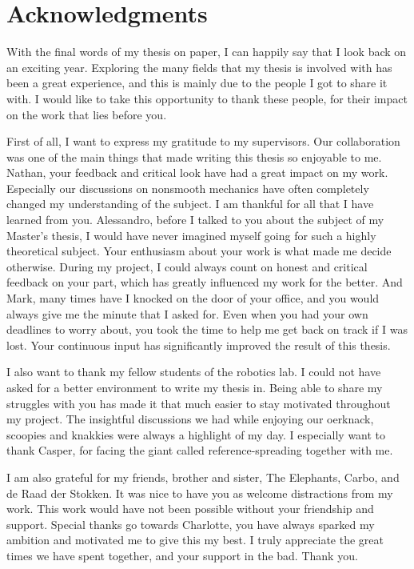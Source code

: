 \documentclass[../DC2019003Bouma.tex]{subfiles}
\begin{document}
\cleartooddpage
\chapter*{Acknowledgments}
With the final words of my thesis on paper, I can happily say that I look back on an exciting year. Exploring the many fields that my thesis is involved with has been a great experience, and this is mainly due to the people I got to share it with. I would like to take this opportunity to thank these people, for their impact on the work that lies before you.

First of all, I want to express my gratitude to my supervisors. Our collaboration was one of the main things that made writing this thesis so enjoyable to me. Nathan, your feedback and critical look have had a great impact on my work. Especially our discussions on nonsmooth mechanics have often completely changed my understanding of the subject. I am thankful for all that I have learned from you. Alessandro, before I talked to you about the subject of my Master's thesis, I would have never imagined myself going for such a highly theoretical subject. Your enthusiasm about your work is what made me decide otherwise. During my project, I could always count on honest and critical feedback on your part, which has greatly influenced my work for the better. And Mark, many times have I knocked on the door of your office, and you would always give me the minute that I asked for. Even when you had your own deadlines to worry about, you took the time to help me get back on track if I was lost. Your continuous input has significantly improved the result of this thesis.

I also want to thank my fellow students of the robotics lab. I could not have asked for a better environment to write my thesis in. Being able to share my struggles with you has made it that much easier to stay motivated throughout my project. The insightful discussions we had while enjoying our oerknack, scoopies and knakkies were always a highlight of my day. I especially want to thank Casper, for facing the giant called reference-spreading together with me.

I am also grateful for my friends, brother and sister, The Elephants, Carbo, and de Raad der Stokken. It was nice to have you as welcome distractions from my work. This work would have not been possible without your friendship and support. Special thanks go towards Charlotte, you have always sparked my ambition and motivated me to give this my best. I truly appreciate the great times we have spent together, and your support in the bad. Thank you.
\end{document}
